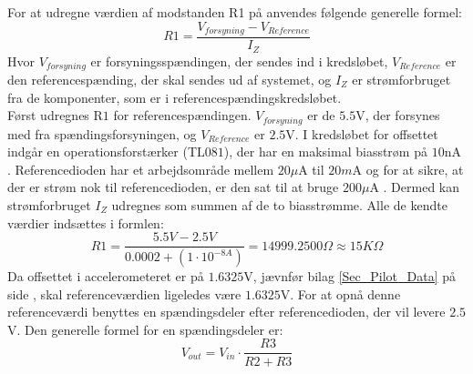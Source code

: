 \noindent For at udregne værdien af modstanden R1 på  anvendes følgende generelle formel:
\begin{equation}\label{eq:udregning_modstand}
R1 = \dfrac{V_{forsyning} - V_{Reference}}{I_{Z}}
\end{equation}
\noindent Hvor $V_{forsyning}$ er forsyningsspændingen, der sendes ind i kredsløbet, $V_{Reference}$ er den referencespænding, der skal sendes ud af systemet, og $I_{Z}$ er strømforbruget fra de komponenter, som er i referencespændingskredsløbet. \\
Først udregnes R$1$ for referencespændingen. $V_{forsyning}$ er de $5.5$V, der forsynes med fra spændingsforsyningen, og $V_{Reference}$ er $2.5$V. I kredsløbet for offsettet indgår en operationsforstærker (TL$081$), der har en maksimal biasstrøm på $10$nA \cite{Corporation1995}. Referencedioden har et arbejdsområde mellem $20\mu$A til $20m$A og for at sikre, at der er strøm nok til referencedioden, er den sat til at bruge $200\mu$A \cite{Instruments2005}. Dermed kan strømforbruget $I_{Z}$ udregnes som summen af de to biasstrømme. Alle de kendte værdier indsættes i formlen:
\begin{equation}
R1 = \frac{5.5V - 2.5V}{0.0002 + (1 \cdot 10^{-8A})} = 14999.2500\Omega \approx 15K\Omega
\end{equation}  
Da offsettet i accelerometeret er på $1.6325$V, jævnfør bilag \ref{Sec_Pilot_Data} på side \pageref{Sec_Pilot_Data}, skal referenceværdien ligeledes være $1.6325$V. For at opnå denne referenceværdi benyttes en spændingsdeler efter referencedioden, der vil levere $2.5$V. Den generelle formel for en spændingsdeler er: 
\begin{equation} \label{eq:Spaendingsdeler}
V_{out} = V_{in} \cdot \dfrac{R3}{R2 + R3}
\end{equation}

